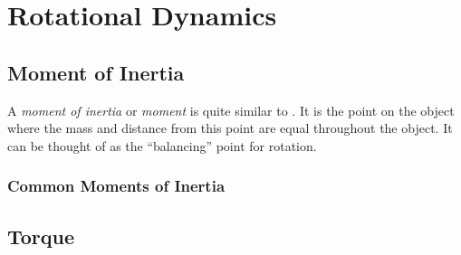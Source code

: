 \section{Rotational Dynamics} \label{sec:Rotational Dynamics}

\subsection{Moment of Inertia} \label{subsec:Moment of Inertia}
\begin{definition} \label{def:Moment of Inertia}
  A \emph{moment of inertia} or \emph{moment} is quite similar to .
  It is the point on the object where the mass and distance from this point are equal throughout the object.
  It can be thought of as the ``balancing'' point for rotation.
\end{definition}

\subsubsection{Common Moments of Inertia} \label{subsubsec:Common Moments of Inertia}
\subsection{Torque}